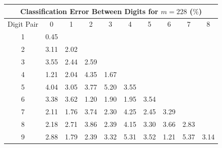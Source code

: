 \documentclass{article}[12pt]
\begin{document}
\begin{enumerate}
\begin{table}[h]
\end{table}

\begin{table}[h]
\centering
\begin{tabular}{|c||c|c|c|c|c|c|c|c|c|} \hline
\multicolumn{10}{|c|}{Classification Error Between Digits for $m=228$ ($\%$)} \\ \hline
Digit Pair &0& 1& 2& 3& 4& 5& 6& 7& 8 \\ \hline \hline
1 &0.45  & & & & & & & & \\ \hline
2 &3.11  &2.02  & & & & & & &\\ \hline
3 &3.55  &2.44  &2.59  & & & &  & &\\ \hline
4 &1.21  &2.04  &4.35  &1.67  & & & &  &\\ \hline
5 &4.04  &3.05  &3.77  &5.20  &3.55  & &  & &\\ \hline
6 &3.38  &3.62  &1.20  &1.90  &1.95  &3.54  & & &\\ \hline
7 &2.11  &1.76  &3.74  &2.30  &4.25  &2.45  &3.29  &  &\\ \hline
8 &2.18  &2.71  &3.86  &2.39  &4.15  &3.30  &3.66  &2.83   &\\ \hline
9 &2.88  &1.79  &2.39  &3.32  &5.31  &3.52  &1.21  &5.37  &3.14  \\ \hline
\end{tabular}
\end{table}
\end{enumerate}
\end{document}
